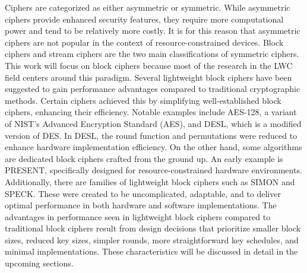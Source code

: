 \documentclass[conference,compsoc]{IEEEtran}
\begin{document}
Ciphers are categorized as either asymmetric or symmetric. While asymmetric ciphers provide enhanced security features, they require more computational power and tend to be relatively more costly. It is for this reason that asymmetric ciphers are not popular in the context of resource-constrained devices. Block ciphers and stream ciphers are the two main classifications of symmetric ciphers. This work will focus on block ciphers because most of the research in the LWC field centers around this paradigm.
Several lightweight block ciphers have been suggested to gain performance advantages compared to traditional cryptographic methods. Certain ciphers achieved this by simplifying well-established block ciphers, enhancing their efficiency. Notable examples include AES-128\cite{AES-128}, a variant of NIST's Advanced Encryption Standard (AES), and DESL\cite{DESL}, which is a modified version of DES. In DESL, the round function and permutations were reduced to enhance hardware implementation efficiency.
On the other hand, some algorithms are dedicated block ciphers crafted from the ground up. An early example is PRESENT\cite{PRESENT}, specifically designed for resource-constrained hardware environments. Additionally, there are families of lightweight block ciphers such as SIMON and SPECK\cite{SIMONSPECK}. These were created to be uncomplicated, adaptable, and to deliver optimal performance in both hardware and software implementations.
The advantages in performance seen in lightweight block ciphers compared to traditional block ciphers result from design decisions that prioritize smaller block sizes, reduced key sizes, simpler rounds, more straightforward key schedules, and minimal implementations. These characteristics will be discussed in detail in the upcoming sections.
\end{document}
